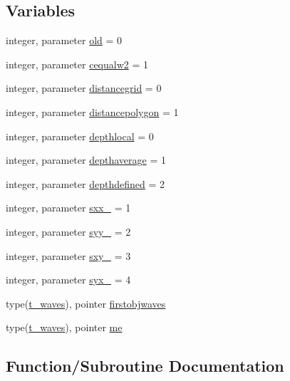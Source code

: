 \subsection*{Variables}
\begin{DoxyCompactItemize}
\item 
integer, parameter \mbox{\hyperlink{namespacemodulewaves_a37ca976268a75e2ffe857357fae6261e}{old}} = 0
\item 
integer, parameter \mbox{\hyperlink{namespacemodulewaves_afc5fc3687c43abb90ea8cc2924589fce}{cequalw2}} = 1
\item 
integer, parameter \mbox{\hyperlink{namespacemodulewaves_a8b9afda07a4ea806082f5af67fe11d9b}{distancegrid}} = 0
\item 
integer, parameter \mbox{\hyperlink{namespacemodulewaves_a87b7edc9eb41fa478761848a60f71b4c}{distancepolygon}} = 1
\item 
integer, parameter \mbox{\hyperlink{namespacemodulewaves_a27abfbda301e88b5203ea2a634fa7a94}{depthlocal}} = 0
\item 
integer, parameter \mbox{\hyperlink{namespacemodulewaves_aa5509403ebbe9faf3f9a266a1e8786e5}{depthaverage}} = 1
\item 
integer, parameter \mbox{\hyperlink{namespacemodulewaves_a06e058d903999d0b1ea133a633d3ba26}{depthdefined}} = 2
\item 
integer, parameter \mbox{\hyperlink{namespacemodulewaves_a4a5a7aa45ca3a0cba93680cb36c91160}{sxx\+\_\+}} = 1
\item 
integer, parameter \mbox{\hyperlink{namespacemodulewaves_a5389f28c1b6c4aaa509cbbc3861822ac}{syy\+\_\+}} = 2
\item 
integer, parameter \mbox{\hyperlink{namespacemodulewaves_aeb9c4e523fb97892db7106b076e0baec}{sxy\+\_\+}} = 3
\item 
integer, parameter \mbox{\hyperlink{namespacemodulewaves_a586347f5ce4be595211e01d98332e9fb}{syx\+\_\+}} = 4
\item 
type(\mbox{\hyperlink{structmodulewaves_1_1t__waves}{t\+\_\+waves}}), pointer \mbox{\hyperlink{namespacemodulewaves_ac5eadc9545afc228b69aa1f9ddd61a8d}{firstobjwaves}}
\item 
type(\mbox{\hyperlink{structmodulewaves_1_1t__waves}{t\+\_\+waves}}), pointer \mbox{\hyperlink{namespacemodulewaves_a14ae225a2982d0eb7560d9a9f889afb4}{me}}
\end{DoxyCompactItemize}


\subsection{Function/\+Subroutine Documentation}
\mbox{\label{namespacemodulewaves_a297c227bd5b05df6253e23b3cba4aaca}} 
